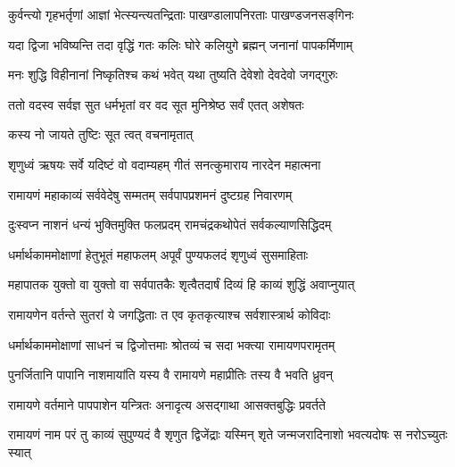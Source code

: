 \twolineshloka
{कुर्वन्त्यो गृहभर्तृणां आज्ञां भेत्स्यन्त्यतन्द्रिताः}
{पाखण्डालापनिरताः पाखण्डजनसङ्‌गिनः}%

 

\twolineshloka
{यदा द्विजा भविष्यन्ति तदा वृद्धिं गतः कलिः}
{घोरे कलियुगे ब्रह्मन् जनानां पापकर्मिणाम्}%

 

\twolineshloka
{मनः शुद्धि विहीनानां निष्कृतिश्च कथं भवेत्}
{यथा तुष्यति देवेशो देवदेवो जगद्‌गुरुः}%

 

\twolineshloka
{ततो वदस्व सर्वज्ञ सुत धर्मभृतां वर}
{वद सूत मुनिश्रेष्ठ सर्वं एतत् अशेषतः}%

 
\onelineshloka
{कस्य नो जायते तुष्टिः सूत त्वत् वचनामृतात्}%



\twolineshloka
{शृणुध्वं ऋषयः सर्वे यदिष्टं वो वदाम्यहम्}
{गीतं सनत्कुमाराय नारदेन महात्मना}%

 

\twolineshloka
{रामायणं महाकाव्यं सर्ववेदेषु सम्मतम्}
{सर्वपापप्रशमनं दुष्टग्रह निवारणम्}%

 

\twolineshloka
{दुःस्वप्न नाशनं धन्यं भुक्तिमुक्ति फलप्रदम्}
{रामचंद्रकथोपेतं सर्वकल्याणसिद्धिदम्}%

 

\twolineshloka
{धर्मार्थकाममोक्षाणां हेतुभूतं महाफलम्}
{अपूर्वं पुण्यफलदं शृणुध्वं सुसमाहिताः}%

 

\twolineshloka
{महापातक युक्तो वा युक्तो वा सर्वपातकैः}
{शृत्वैतदार्षं दिव्यं हि काव्यं शुद्धिं अवाप्नुयात्}%

 

\twolineshloka
{रामायणेन वर्तन्ते सुतरां ये जगद्धिताः}
{त एव कृतकृत्याश्च सर्वशास्त्रार्थ कोविदाः}%

 

\twolineshloka
{धर्मार्थकाममोक्षाणां साधनं च द्विजोत्तमाः}
{श्रोतव्यं च सदा भक्त्या रामायणपरामृतम्}%

 
\twolineshloka
{पुनर्जितानि पापानि नाशमायांति यस्य वै}
{रामायणे महाप्रीतिः तस्य वै भवति ध्रुवन्}%

 

\twolineshloka
{रामायणे वर्तमाने पापपाशेन यन्त्रितः}
{अनादृत्य असद्‌गाथा आसक्तबुद्धिः प्रवर्तते}%

 

\twolineshloka
{रामायणं नाम परं तु काव्यं सुपुण्यदं वै शृणुत द्विजेंद्राः}
{यस्मिन् शृते जन्मजरादिनाशो भवत्यदोषः स नरोऽच्युतः स्यात्}%

